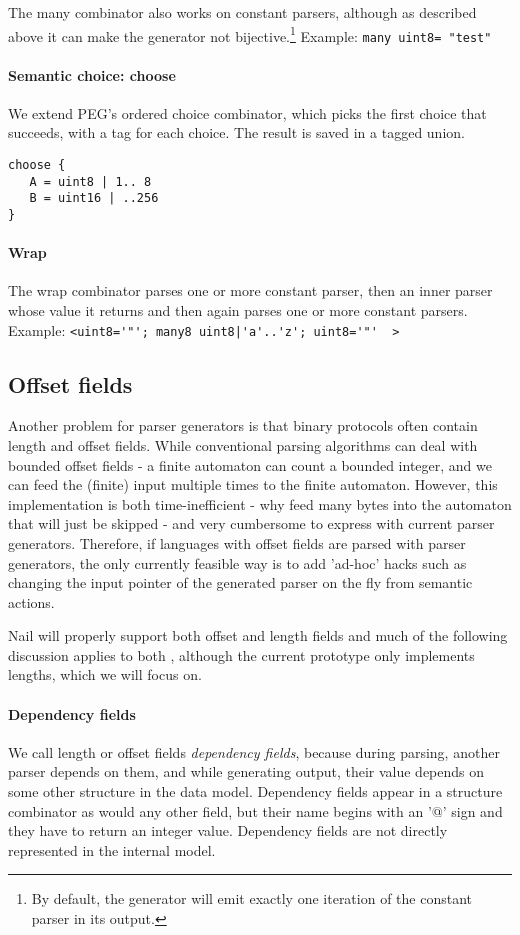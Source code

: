 The many combinator also works on constant parsers, although as described above it can make the
generator not bijective.\footnote{By default, the generator will emit exactly one iteration of the
  constant parser in its output.} Example: \texttt{many uint8= "test"}


\paragraph{Semantic choice: choose}
We extend PEG's ordered choice combinator, which picks the first choice that succeeds, with a tag
for each choice. The result is saved in a tagged union. 

\begin{verbatim}
choose {
   A = uint8 | 1.. 8
   B = uint16 | ..256
}
\end{verbatim}
\paragraph{Wrap}

The wrap combinator parses one or more constant parser, then an inner parser whose value it returns
and then again parses one or more constant parsers.\\ Example: 
\verb+<uint8='"'; many8 uint8|'a'..'z'; uint8='"'  >+

\subsection{Offset fields}
Another problem for parser generators is that binary protocols often contain length and offset
fields. While conventional parsing algorithms can deal with bounded offset fields - a finite
automaton can count a bounded integer, and we can feed the (finite) input multiple times to the
finite automaton. However, this implementation is both time-inefficient - why feed many bytes into
the automaton that will just be skipped - and very cumbersome to express with current parser
generators. Therefore, if languages with offset fields are parsed with parser generators, the only
currently feasible way is to add 'ad-hoc' hacks such as changing the input pointer of the generated
parser on the fly from semantic actions. 

Nail will properly support both offset and length fields and much of the following discussion
applies to both , although the current prototype only implements lengths, which we will focus on. 

\paragraph{Dependency fields}
We call length or offset fields \textit{dependency fields}, because during parsing, another parser
depends on them, and while generating output, their value depends on some other structure in the
data model.
Dependency fields appear in a structure combinator as would any other field, but their name begins
with an '@' sign and they have to return an integer value. Dependency fields are not directly
represented in the internal model. 

